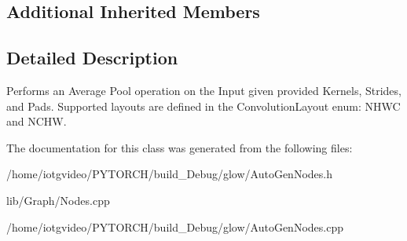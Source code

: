 \subsection*{Additional Inherited Members}


\subsection{Detailed Description}
Performs an Average Pool operation on the Input given provided Kernels, Strides, and Pads. Supported layouts are defined in the Convolution\+Layout enum\+: N\+H\+WC and N\+C\+HW. 

The documentation for this class was generated from the following files\+:\begin{DoxyCompactItemize}
\item 
/home/iotgvideo/\+P\+Y\+T\+O\+R\+C\+H/build\+\_\+\+Debug/glow/Auto\+Gen\+Nodes.\+h\item 
lib/\+Graph/Nodes.\+cpp\item 
/home/iotgvideo/\+P\+Y\+T\+O\+R\+C\+H/build\+\_\+\+Debug/glow/Auto\+Gen\+Nodes.\+cpp\end{DoxyCompactItemize}
